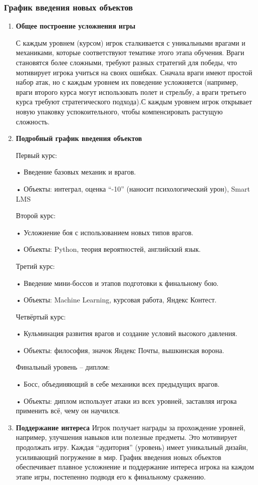 \subsubsection{График введения новых объектов}
    \begin{enumerate}
    \item \textbf{Общее построение усложнения игры} \par
    С каждым уровнем (курсом) игрок сталкивается с уникальными врагами и механиками, которые соответствуют тематике этого этапа обучения. Враги становятся более сложными, требуют разных стратегий для победы, что мотивирует игрока учиться на своих ошибках. Сначала враги имеют простой набор атак, но с каждым уровнем их поведение усложняется (например, враги второго курса могут использовать полет и стрельбу, а враги третьего курса требуют стратегического подхода).С каждым уровнем игрок открывает новую упаковку успокоительного, чтобы компенсировать растущую сложность.
    \item\textbf{Подробный график введения объектов} \par
    Первый курс: \par
    • Введение базовых механик и врагов. \par
    • Объекты: интеграл, оценка “-10” (наносит психологический урон), Smart LMS \par
    Второй курс: \par
    • Усложнение боя с использованием новых типов врагов. \par
    • Объекты: Python, теория вероятностей, английский язык. \par
    Третий курс: \par
    • Введение мини-боссов и этапов подготовки к финальному бою. \par
    • Объекты: Machine Learning, курсовая работа, Яндекс Контест. \par
    Четвёртый курс: \par
    • Кульминация развития врагов и создание условий высокого давления. \par
    • Объекты: философия, значок Яндекс Почты, вышкинская ворона. \par
    Финальный уровень – диплом: \par
    • Босс, объединяющий в себе механики всех предыдущих врагов. \par
    • Объекты: диплом использует атаки из всех уровней, заставляя игрока применить всё, чему он научился. \par
    \item\textbf{Поддержание интереса}
    Игрок получает награды за прохождение уровней, например, улучшения навыков или полезные предметы. Это мотивирует продолжать игру. Каждая “аудитория” (уровень) имеет уникальный дизайн, усиливающий погружение в мир. График введения новых объектов обеспечивает плавное усложнение и поддержание интереса игрока на каждом этапе игры, постепенно подводя его к финальному сражению.
    \end{enumerate}